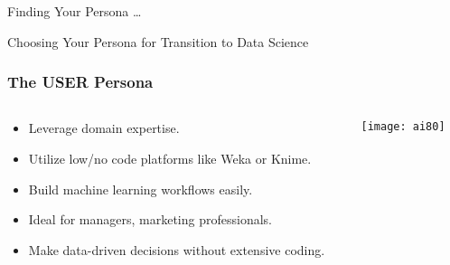 \begin{frame}[fragile]\frametitle{}
	
	\begin{center}
	{\Large Finding Your Persona \ldots

	Choosing Your Persona for Transition to Data Science}  
	\end{center}

\end{frame}



\begin{frame}[fragile]\frametitle{The USER Persona}

\begin{columns}
    \begin{column}[T]{0.6\linewidth}
        \begin{itemize}
            \item Leverage domain expertise.
            \item Utilize low/no code platforms like Weka or Knime.
            \item Build machine learning workflows easily.
            \item Ideal for managers, marketing professionals.
            \item Make data-driven decisions without extensive coding.
        \end{itemize}

    \end{column}
    \begin{column}[T]{0.4\linewidth}


			\begin{center}
			\texttt{[image: ai80]}
			\end{center}
			
    \end{column}
  \end{columns}
  
  

\end{frame}

